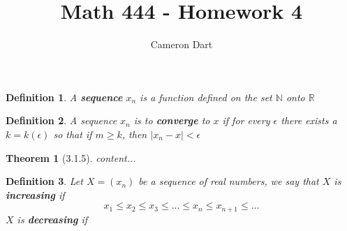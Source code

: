 \documentclass[12pt]{article}
\newcommand{\N}{\mathbb{N}}
\newcommand{\R}{\mathbb{R}}
\newtheorem{df}{Definition}
\newtheorem{thm}{Theorem}
\begin{document}
	\title{Math 444 - Homework 4}
	\author{Cameron Dart}
	\maketitle

\begin{df}
	A \textbf{sequence} $x_n$ is a function defined on the set $\N$ onto $\R$
\end{df}

\begin{df}
	A sequence  $x_n$ is to \textbf{converge} to $x$ if for every $\epsilon$ there exists a $k = k(\epsilon)$ so that if $m \geq k$, then $ | x_n - x | < \epsilon$
\end{df}

\begin{thm}[3.1.5]
	content...
\end{thm}

\begin{df}
	Let $X = (x_n)$ be a sequence of real numbers, we say that $X$ is \textbf{increasing} if
	\[
		x_1 \leq x_2 \leq x_3 \leq ... \leq x_n \leq x_{n + 1} \leq ...
	\]
	$X$ is \textbf{decreasing} if 
\end{df}
\end{document}
